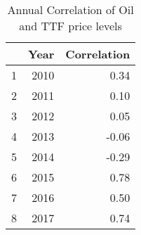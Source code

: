\begin{table}[ht]
\centering
\begin{tabular}{rrr}
  \hline
 & Year & Correlation \\ 
  \hline
1 & 2010 & 0.34 \\ 
  2 & 2011 & 0.10 \\ 
  3 & 2012 & 0.05 \\ 
  4 & 2013 & -0.06 \\ 
  5 & 2014 & -0.29 \\ 
  6 & 2015 & 0.78 \\ 
  7 & 2016 & 0.50 \\ 
  8 & 2017 & 0.74 \\ 
   \hline
\end{tabular}
\caption{Annual Correlation of Oil and TTF price levels} 
\label{tab:oil_ttf_level_corr_annual}
\end{table}
